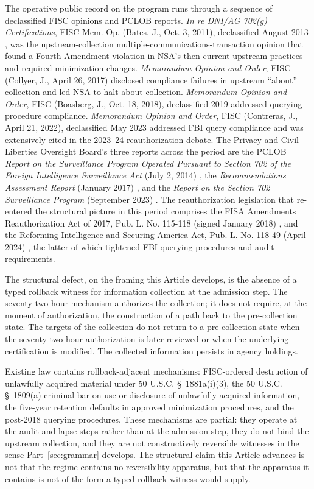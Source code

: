 The operative public record on the program runs through a sequence of declassified FISC opinions and
PCLOB reports.
\emph{In re DNI/AG 702(g) Certifications}, FISC Mem. Op. (Bates, J., Oct. 3, 2011), declassified August
2013 \cite{ref_fisc_bates_2011_upstream}, was the upstream-collection multiple-communications-transaction
opinion that found a Fourth Amendment violation in NSA's then-current upstream practices and required
minimization changes.
\emph{Memorandum Opinion and Order}, FISC (Collyer, J., April 26, 2017)
\cite{ref_fisc_collyer_2017_about} disclosed compliance failures in upstream ``about'' collection and
led NSA to halt about-collection.
\emph{Memorandum Opinion and Order}, FISC (Boasberg, J., Oct. 18, 2018), declassified 2019
\cite{ref_fisc_boasberg_2018} addressed querying-procedure compliance.
\emph{Memorandum Opinion and Order}, FISC (Contreras, J., April 21, 2022), declassified May 2023
\cite{ref_fisc_contreras_2022} addressed FBI query compliance and was extensively cited in the
2023--24 reauthorization debate.
The Privacy and Civil Liberties Oversight Board's three reports across the period are the PCLOB
\emph{Report on the Surveillance Program Operated Pursuant to Section 702 of the Foreign Intelligence
Surveillance Act} (July 2, 2014) \cite{ref_pclob_702_2014}, the \emph{Recommendations Assessment
Report} (January 2017) \cite{ref_pclob_recommendations_2017}, and the \emph{Report on the Section 702
Surveillance Program} (September 2023) \cite{ref_pclob_702_2023}.
The reauthorization legislation that re-entered the structural picture in this period comprises the
FISA Amendments Reauthorization Act of 2017, Pub. L. No. 115-118 (signed January 2018)
\cite{ref_faa_reauth_2017}, and the Reforming Intelligence and Securing America Act, Pub. L. No.
118-49 (April 2024) \cite{ref_risaa_2024}, the latter of which tightened FBI querying procedures and
audit requirements.

The structural defect, on the framing this Article develops, is the absence of a typed rollback witness
for information collection at the admission step.
The seventy-two-hour mechanism authorizes the collection;
it does not require, at the moment of authorization, the construction of a path back to the
pre-collection state.
The targets of the collection do not return to a pre-collection state when the seventy-two-hour
authorization is later reviewed or when the underlying certification is modified.
The collected information persists in agency holdings.

Existing law contains rollback-adjacent mechanisms: FISC-ordered destruction of unlawfully acquired
material under 50 U.S.C. \S~1881a(i)(3), the 50 U.S.C. \S~1809(a) criminal bar on use or disclosure of
unlawfully acquired information, the five-year retention defaults in approved minimization procedures,
and the post-2018 querying procedures.
These mechanisms are partial: they operate at the audit and lapse steps rather than at the admission
step, they do not bind the upstream collection, and they are not constructively reversible witnesses in
the sense Part~\ref{sec:grammar} develops.
The structural claim this Article advances is not that the regime contains no reversibility apparatus,
but that the apparatus it contains is not of the form a typed rollback witness would supply.

